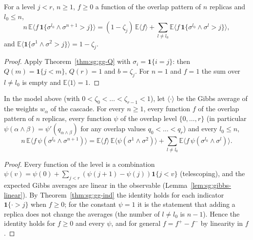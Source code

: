 \begin{theorem}\label{thm:sg:gg-ind}
  \leanok
For a level $j<r$, $n\ge1$, $f\ge0$ a function of the overlap pattern of $n$ replicas and $l_0\le n$,
\[
 n\,\mathbb E\langle f\,\mathbf 1\{\sigma^{l_0}\wedge\sigma^{n+1}>j\}\rangle=(1-\zeta_j)\,\mathbb E\langle f\rangle+\sum_{l\ne l_0}\mathbb E\langle f\,\mathbf 1\{\sigma^{l_0}\wedge\sigma^l>j\}\rangle ,
\]
and $\mathbb E\langle\mathbf 1\{\sigma^1\wedge\sigma^2>j\}\rangle=1-\zeta_j$.
\end{theorem}
\begin{proof}
  \leanok
Apply Theorem~\ref{thm:sg:gg-Q} with $\sigma_i=\mathbf 1\{i=j\}$: then $Q(m)=\mathbf 1\{j<m\}$, $Q(r)=1$ and $b=\zeta_j$. For $n=1$ and $f=1$ the sum over $l\ne l_0$ is empty and $\mathbb E\langle1\rangle=1$.
\end{proof}

\begin{theorem}\label{thm:sg:gg-cascade}
  \leanok
In the model above (with $0<\zeta_0<\dots<\zeta_{r-1}<1$), let $\langle\cdot\rangle$ be the Gibbs average of the weights $w_\alpha$ of the cascade. For every $n\ge1$, every function $f$ of the overlap pattern of $n$ replicas,
every function $\psi$ of the overlap level $\{0,\dots,r\}$ (in particular $\psi(\alpha\wedge\beta)=\psi'(q_{\alpha\wedge\beta})$ for any overlap values $q_0<\dots<q_r$) and every $l_0\le n$,
\[
 n\,\mathbb E\langle f\,\psi(\sigma^{l_0}\wedge\sigma^{n+1})\rangle=\mathbb E\langle f\rangle\,\mathbb E\langle\psi(\sigma^1\wedge\sigma^2)\rangle+\sum_{l\ne l_0}\mathbb E\langle f\,\psi(\sigma^{l_0}\wedge\sigma^l)\rangle .
\]
\end{theorem}
\begin{proof}
  \leanok
Every function of the level is a combination $\psi(v)=\psi(0)+\sum_{j<r}(\psi(j+1)-\psi(j))\mathbf 1\{j<v\}$ (telescoping), and the expected Gibbs averages are linear in the observable (Lemma~\ref{lem:sg:gibbs-linear}).
By Theorem~\ref{thm:sg:gg-ind} the identity holds for each indicator $\mathbf 1\{\cdot>j\}$ when $f\ge0$; for the constant $\psi=1$ it is the statement that adding a replica does not change the averages
(the number of $l\ne l_0$ is $n-1$). Hence the identity holds for $f\ge0$ and every $\psi$, and for general $f=f^+-f^-$ by linearity in $f$.
\end{proof}

